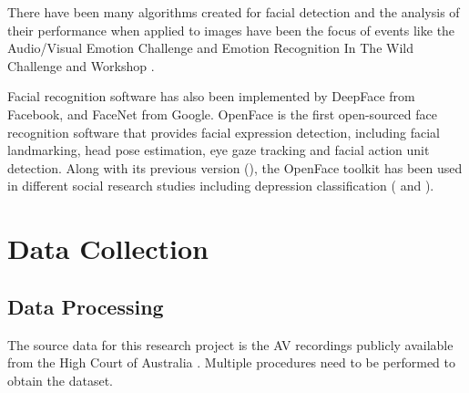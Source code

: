 \documentclass{monashthesis}
\begin{document}
There have been many algorithms created for facial detection and the analysis of their performance when applied to images have been the focus of events like the Audio/Visual Emotion Challenge \autocites{schuller2012avec}{schuller2011avec} and Emotion Recognition In The Wild Challenge and Workshop \autocites{dhall2013emotion}{kahou2013combining}.

Facial recognition software has also been implemented by DeepFace \autocite{taigman2014deepface} from Facebook, and FaceNet \autocite{schroff2015facenet} from Google. OpenFace \autocite{baltrusaitis2018openface} is the first open-sourced face recognition software that provides facial expression detection, including facial landmarking, head pose estimation, eye gaze tracking and facial action unit detection. Along with its previous version (\textcite{baltruvsaitis2016openface}), the OpenFace toolkit has been used in different social research studies including depression classification (\textcite{yang2016decision} and \textcite{nasir2016multimodal}).

\hypertarget{data-collection}{%
\chapter{Data Collection}\label{data-collection}}

\hypertarget{data-processing}{%
\section{Data Processing}\label{data-processing}}

The source data for this research project is the AV recordings publicly available from the High Court of Australia \autocite{highcourtau}. Multiple procedures need to be performed to obtain the dataset.
\end{document}
